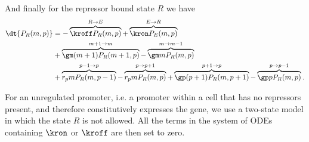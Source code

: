And finally for the repressor bound state $R$ we have
\begin{equation}
  \begin{aligned}
    \dt{P_R(m, p)} &=
    - \overbrace{\kroff P_R(m, p)}^{R \rightarrow E} %
    + \overbrace{\kron P_E(m, p)}^{E \rightarrow R}\\ %
    &+ \overbrace{\gm (m + 1) P_R(m+1 , p)}^{m+1 \rightarrow m} %
    - \overbrace{\gm m P_R(m , p)}^{m \rightarrow m-1}\\ %
    &+ \overbrace{r_p m P_R(m, p - 1)}^{p-1 \rightarrow p} %
    - \overbrace{r_p m P_R(m, p)}^{p \rightarrow p+1} %
    + \overbrace{\gp (p + 1) P_R(m, p + 1)}^{p + 1 \rightarrow p} %
    - \overbrace{\gp p P_R(m, p)}^{p \rightarrow p-1}. %
  \end{aligned}
\end{equation}

For an unregulated promoter, i.e. a promoter within a cell that has no
repressors present, and therefore constitutively expresses the gene, we use a
two-state model in which the state $R$ is not allowed. All the terms in the
system of ODEs containing $\kron$ or $\kroff$ are then set to zero.

